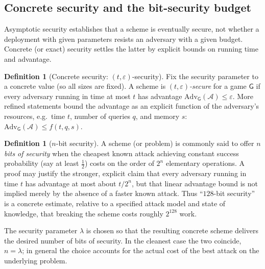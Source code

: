 \documentclass[11pt,a4paper]{article}
\theoremstyle{definition}
\newtheorem{definition}[theorem]{Definition}
\theoremstyle{remark}
\begin{document}
\subsection{Concrete security and the bit-security budget}
\label{model:subsec:concrete}

Asymptotic security establishes that a scheme is eventually secure, not
whether a deployment with given parameters resists an adversary with a
given budget. Concrete (or exact) security settles the latter by
explicit bounds on running time and advantage.

\begin{definition}[Concrete security:
\((t,\varepsilon)\)-security]\label{model:def:concrete}
Fix the security parameter to a concrete value (so all sizes are
fixed). A scheme is \emph{\((t,\varepsilon)\)-secure} for a game
\(\mathsf{G}\) if every adversary running in time at most \(t\) has
advantage \(\mathrm{Adv}_{\mathsf{G}}(\mathcal{A}) \leq \varepsilon\).
More refined statements bound the advantage as an explicit function of
the adversary's resources, e.g.\ time \(t\), number of queries \(q\),
and memory \(s\):
\(\mathrm{Adv}_{\mathsf{G}}(\mathcal{A}) \leq f(t,q,s)\).
\end{definition}

\begin{definition}[\(n\)-bit security]\label{model:def:bitsec}
A scheme (or problem) is commonly said to offer \(n\) \emph{bits of
security} when the cheapest known attack achieving constant success
probability (say at least \(\tfrac12\)) costs on the order of
\(2^{n}\) elementary operations. A proof may
justify the stronger, explicit claim that every adversary running in
time \(t\) has advantage at most about \(t/2^{n}\), but that linear
advantage bound is not implied merely by the absence of a faster known
attack. Thus ``\(128\)-bit security'' is a concrete estimate, relative
to a specified attack model and state of knowledge, that breaking the
scheme costs roughly \(2^{128}\) work.
\end{definition}

The security parameter \(\lambda\) is chosen so that the resulting
concrete scheme delivers the desired number of bits of security. In
the cleanest case the two coincide, \(n = \lambda\); in general the
choice accounts for the actual cost of the best attack on the
underlying problem.
\end{document}
